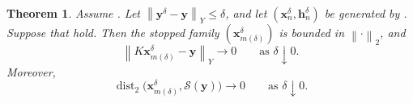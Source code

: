 \documentclass{article}
\newtheorem{theorem}{Theorem}[section]
\theoremstyle{remark}
\newcommand{\norm}[1]{\left\lVert #1 \right\rVert}
\newcommand{\Ssol}{\mathcal{S}}
\newcommand{\bx}{{\bm{x}}}
\newcommand{\by}{{\bm{y}}}
\newcommand{\bh}{{\bm{h}}}
\begin{document}
\begin{theorem}
\label{thm:error-noisy-convergence}
Assume . Let
\(\norm{\by^\delta-\by}_Y\le\delta\), and let
\((\bx_n^\delta,\bh_n^\delta)\) be generated by
. Suppose that
 hold. Then the stopped
family \((\bx_{m(\delta)}^\delta)\) is bounded in \(\norm{\cdot}_2\), and
\begin{equation}\label{eq:error-residual-convergence}
\norm{K\bx_{m(\delta)}^\delta-\by}_Y\to0
\qquad\text{as }\delta\downarrow0.
\end{equation}
Moreover,
\begin{equation}\label{eq:error-set-convergence}
\operatorname{dist}_2
\bigl(\bx_{m(\delta)}^\delta,\Ssol(\by)\bigr)
\to0
\qquad\text{as }\delta\downarrow0.
\end{equation}
\end{theorem}
\end{document}

